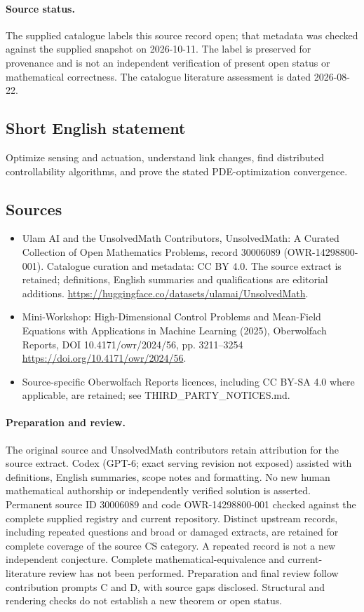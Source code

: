 \documentclass[11pt]{article}
\begin{document}
\paragraph{Source status.}
The supplied catalogue labels this source record open; that metadata was checked against the supplied snapshot on 2026-10-11. The label is preserved for provenance and is not an independent verification of present open status or mathematical correctness. The catalogue literature assessment is dated 2026-08-22.
\subsection{Short English statement}
Optimize sensing and actuation, understand link changes, find distributed controllability algorithms, and prove the stated PDE-optimization convergence.
\subsection{Sources}
\begin{itemize}
\item[\hypertarget{source:30006089:1}{S1}] Ulam AI and the UnsolvedMath Contributors, UnsolvedMath: A Curated Collection of Open Mathematics Problems, record 30006089 (OWR-14298800-001). Catalogue curation and metadata: CC BY 4.0. The source extract is retained; definitions, English summaries and qualifications are editorial additions.
\url{https://huggingface.co/datasets/ulamai/UnsolvedMath}.
\item[\hypertarget{source:30006089:2}{S2}] Mini-Workshop: High-Dimensional Control Problems and Mean-Field Equations with Applications in Machine Learning (2025), Oberwolfach Reports, DOI 10.4171/owr/2024/56, pp. 3211--3254
\url{https://doi.org/10.4171/owr/2024/56}.
\item Source-specific Oberwolfach Reports licences, including CC BY-SA 4.0 where applicable, are retained; see THIRD\_PARTY\_NOTICES.md.
\end{itemize}
\paragraph{Preparation and review.}
The original source and UnsolvedMath contributors retain attribution for the source extract. Codex (GPT-6; exact serving revision not exposed) assisted with definitions, English summaries, scope notes and formatting. No new human mathematical authorship or independently verified solution is asserted. Permanent source ID 30006089 and code OWR-14298800-001 checked against the complete supplied registry and current repository. Distinct upstream records, including repeated questions and broad or damaged extracts, are retained for complete coverage of the source CS category. A repeated record is not a new independent conjecture. Complete mathematical-equivalence and current-literature review has not been performed. Preparation and final review follow contribution prompts C and D, with source gaps disclosed. Structural and rendering checks do not establish a new theorem or open status.
\label{end:30006089}
\end{document}
